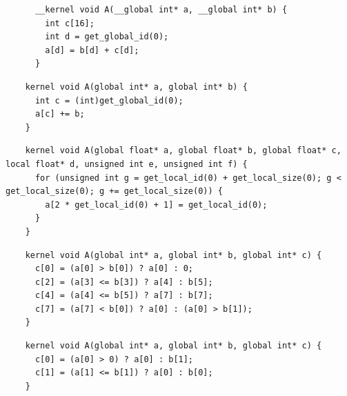 \newsavebox{\UninitRead}
\begin{lrbox}{\UninitRead}
  \hspace{1.5em}
  \begin{lstlisting}
      __kernel void A(__global int* a, __global int* b) {
        int c[16];
        int d = get_global_id(0);
        a[d] = b[d] + c[d];
      }
  \end{lstlisting}
\end{lrbox}

\newsavebox{\IntelPtrAssertion}
\begin{lrbox}{\IntelPtrAssertion}
  \hspace{1.5em}
  \begin{lstlisting}
    kernel void A(global int* a, global int* b) {
      int c = (int)get_global_id(0);
      a[c] += b;
    }
  \end{lstlisting}
\end{lrbox}

\newsavebox{\IntelScalarAssertion}
\begin{lrbox}{\IntelScalarAssertion}
  \hspace{1.5em}
  \begin{lstlisting}
    kernel void A(global float* a, global float* b, global float* c, local float* d, unsigned int e, unsigned int f) {
      for (unsigned int g = get_local_id(0) + get_local_size(0); g < get_local_size(0); g += get_local_size(0)) {
        a[2 * get_local_id(0) + 1] = get_local_id(0);
      }
    }
  \end{lstlisting}
\end{lrbox}

\newsavebox{\BeignetTernary}
\begin{lrbox}{\BeignetTernary}
  \hspace{1.5em}
  \begin{lstlisting}
    kernel void A(global int* a, global int* b, global int* c) {
      c[0] = (a[0] > b[0]) ? a[0] : 0;
      c[2] = (a[3] <= b[3]) ? a[4] : b[5];
      c[4] = (a[4] <= b[5]) ? a[7] : b[7];
      c[7] = (a[7] < b[0]) ? a[0] : (a[0] > b[1]);
    }
  \end{lstlisting}
\end{lrbox}
%

\newsavebox{\BeignetTernarySmaller}
\begin{lrbox}{\BeignetTernarySmaller}
  \hspace{1.5em}
  \begin{lstlisting}
    kernel void A(global int* a, global int* b, global int* c) {
      c[0] = (a[0] > 0) ? a[0] : b[1];
      c[1] = (a[1] <= b[1]) ? a[0] : b[0];
    }
  \end{lstlisting}
\end{lrbox}



